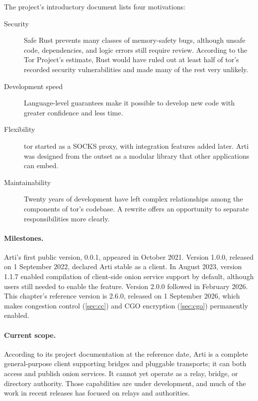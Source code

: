 The project's introductory document lists four motivations:
\begin{description}
  \item[Security] Safe Rust prevents many classes of memory-safety bugs, although unsafe code, dependencies, and logic errors still require review. According to the Tor Project's estimate, Rust would have ruled out at least half of tor's recorded security vulnerabilities and made many of the rest very unlikely.
  \item[Development speed] Language-level guarantees make it possible to develop new code with greater confidence and less time.
  \item[Flexibility] tor started as a SOCKS proxy, with integration features added later. Arti was designed from the outset as a modular library that other applications can embed.
  \item[Maintainability] Twenty years of development have left complex relationships among the components of tor's codebase. A rewrite offers an opportunity to separate responsibilities more clearly.
\end{description}

\paragraph{Milestones.} Arti's first public version, 0.0.1, appeared in October 2021. Version 1.0.0, released on 1 September 2022, declared Arti stable as a client. In August 2023, version 1.1.7 enabled compilation of client-side onion service support by default, although users still needed to enable the feature. Version 2.0.0 followed in February 2026. This chapter's reference version is 2.6.0, released on 1 September 2026, which makes congestion control (\cref{sec:cc}) and CGO encryption (\cref{sec:cgo}) permanently enabled.

\paragraph{Current scope.} According to its project documentation at the reference date, Arti is a complete general-purpose client supporting bridges and pluggable transports; it can both access and publish onion services. It cannot yet operate as a relay, bridge, or directory authority. Those capabilities are under development, and much of the work in recent releases has focused on relays and authorities.

